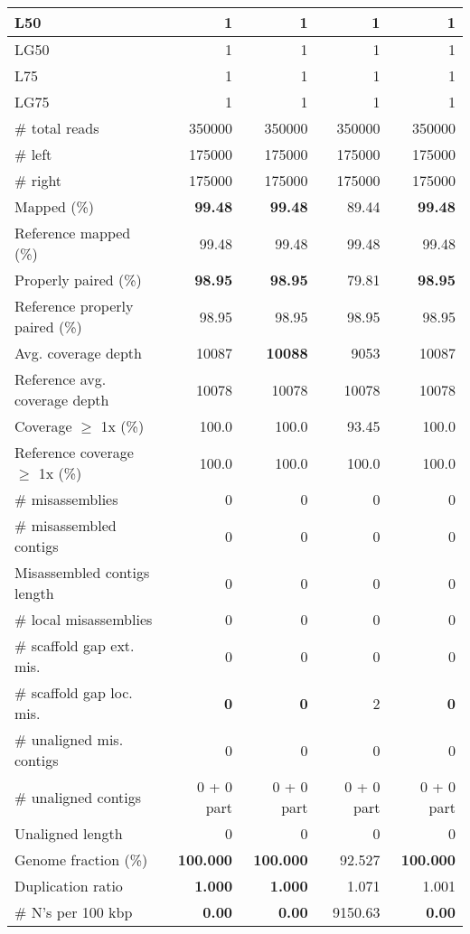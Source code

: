 \documentclass[12pt,a4paper]{article}
\begin{document}
\begin{table}[ht]
\begin{center}
\begin{tabular}{|l*{4}{|r}|}
L50 & 1 & 1 & 1 & 1 \\ \hline
LG50 & 1 & 1 & 1 & 1 \\ \hline
L75 & 1 & 1 & 1 & 1 \\ \hline
LG75 & 1 & 1 & 1 & 1 \\ \hline
\# total reads & 350000 & 350000 & 350000 & 350000 \\ \hline
\# left & 175000 & 175000 & 175000 & 175000 \\ \hline
\# right & 175000 & 175000 & 175000 & 175000 \\ \hline
Mapped (\%) & {\bf 99.48} & {\bf 99.48} & 89.44 & {\bf 99.48} \\ \hline
Reference mapped (\%) & 99.48 & 99.48 & 99.48 & 99.48 \\ \hline
Properly paired (\%) & {\bf 98.95} & {\bf 98.95} & 79.81 & {\bf 98.95} \\ \hline
Reference properly paired (\%) & 98.95 & 98.95 & 98.95 & 98.95 \\ \hline
Avg. coverage depth & 10087 & {\bf 10088} & 9053 & 10087 \\ \hline
Reference avg. coverage depth & 10078 & 10078 & 10078 & 10078 \\ \hline
Coverage $\geq$ 1x (\%) & 100.0 & 100.0 & 93.45 & 100.0 \\ \hline
Reference coverage $\geq$ 1x (\%) & 100.0 & 100.0 & 100.0 & 100.0 \\ \hline
\# misassemblies & 0 & 0 & 0 & 0 \\ \hline
\# misassembled contigs & 0 & 0 & 0 & 0 \\ \hline
Misassembled contigs length & 0 & 0 & 0 & 0 \\ \hline
\# local misassemblies & 0 & 0 & 0 & 0 \\ \hline
\# scaffold gap ext. mis. & 0 & 0 & 0 & 0 \\ \hline
\# scaffold gap loc. mis. & {\bf 0} & {\bf 0} & 2 & {\bf 0} \\ \hline
\# unaligned mis. contigs & 0 & 0 & 0 & 0 \\ \hline
\# unaligned contigs & 0 + 0 part & 0 + 0 part & 0 + 0 part & 0 + 0 part \\ \hline
Unaligned length & 0 & 0 & 0 & 0 \\ \hline
Genome fraction (\%) & {\bf 100.000} & {\bf 100.000} & 92.527 & {\bf 100.000} \\ \hline
Duplication ratio & {\bf 1.000} & {\bf 1.000} & 1.071 & 1.001 \\ \hline
\# N's per 100 kbp & {\bf 0.00} & {\bf 0.00} & 9150.63 & {\bf 0.00} \\ \hline

\end{tabular}
\end{center}
\end{table}
\end{document}
